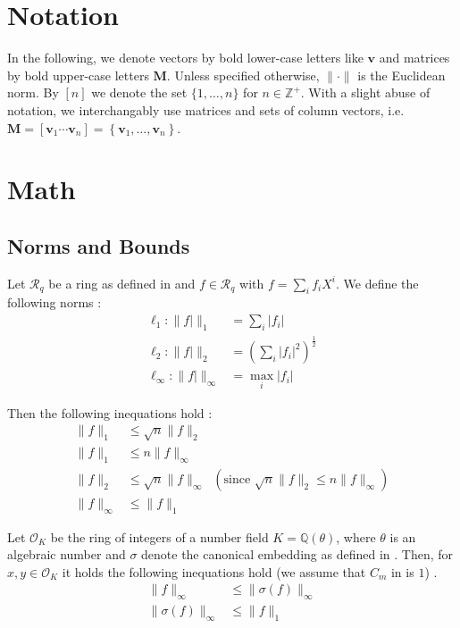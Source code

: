 \documentclass[
  a4paper,  %
  twoside,  %
  bibliography=totoc,
  headsepline,
  cleardoublepage=empty,
  parskip=half,
  draft=false
]{scrbook}
\begin{document}
\section{Notation}
In the following, we denote vectors by bold lower-case letters like $\mathbf{v}$ and matrices by bold upper-case letters $\mathbf{M}$. Unless specified otherwise, $\| \cdot \|$ is the Euclidean norm. By $[n]$ we denote the set $\{1, \dots, n\}$ for $n\in \mathbb{Z}^+$. With a slight abuse of notation, we interchangably use matrices and sets of column vectors, i.e. $\mathbf{M} = \left[\mathbf{v}_1 \cdots \mathbf{v}_n\right] = \left\{\mathbf{v}_1, \dots, \mathbf{v}_n\right\}$. 


\section{Math} 

\subsection{Norms and Bounds} %
Let $\mathcal{R}_q$ be a ring as defined in \cite{BDLOP18} and $f \in \mathcal{R}_q$ with $f = \sum_i f_i X^i$. We define the following norms \cite{BDLOP18}:
\begin{align}
  \ell_1 : \| f| \|_1 &= \sum_i |f_i|\\
  \ell_2 : \| f| \|_2 &= \left(\sum_i |f_i|^2\right) ^{\frac{1}{2}}\\
  \ell_\infty : \| f| \|_\infty &= \max_i |f_i|
\end{align}

Then the following inequations hold \cite{BDLOP18}:
\begin{align}
  \| f \|_1 &\leq \sqrt{n} \| f \|_2 \label{norm1}\\
  \| f \|_1 &\leq n \| f \|_\infty \label{norm2}\\
  \| f \|_2 &\leq \sqrt{n} \| f \|_\infty \;\;(\text{since }  \sqrt{n} \| f \|_2 \leq n \| f \|_\infty) \label{norm3}\\
  \| f \|_\infty& \leq \| f \|_1 \label{norm4}
\end{align}

Let $\mathcal{O}_K$ be the ring of integers of a number field $K=\mathbb{Q}(\theta)$, where $\theta$ is an algebraic number and $\sigma$ denote the canonical embedding as defined in \cite{DPSZ12}. Then, for $x, y \in \mathcal{O}_K$ it holds the following inequations hold (we assume that $C_m$ in \cite{DPSZ12} is $1$) \cite{DPSZ12}. 
\begin{align}
  \| f \|_\infty &\leq \| \sigma(f) \|_\infty \label{norm5}\\
  \| \sigma(f) \|_\infty &\leq \| f \|_1 \label{norm6}
\end{align}
\end{document}
